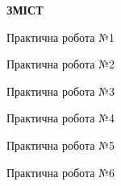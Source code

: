\documentclass[a4paper]{article}
\begin{document}
\centering
\textbf{ЗМІСТ}

\fontsize{14}{16}\selectfont
\justifying

\raggedright

\renewcommand{\baselinestretch}{1.5}\selectfont
Практична робота №1 \dotfill

Практична робота №2 \dotfill

Практична робота №3 \dotfill

Практична робота №4 \dotfill

Практична робота №5 \dotfill

Практична робота №6 \dotfill
\end{document}
